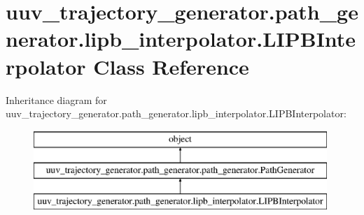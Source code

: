 \hypertarget{classuuv__trajectory__generator_1_1path__generator_1_1lipb__interpolator_1_1LIPBInterpolator}{}\section{uuv\+\_\+trajectory\+\_\+generator.\+path\+\_\+generator.\+lipb\+\_\+interpolator.\+L\+I\+P\+B\+Interpolator Class Reference}
\label{classuuv__trajectory__generator_1_1path__generator_1_1lipb__interpolator_1_1LIPBInterpolator}
Inheritance diagram for uuv\+\_\+trajectory\+\_\+generator.\+path\+\_\+generator.\+lipb\+\_\+interpolator.\+L\+I\+P\+B\+Interpolator\+:\begin{figure}[H]
\begin{center}
\leavevmode
\includegraphics[height=3.000000cm]{classuuv__trajectory__generator_1_1path__generator_1_1lipb__interpolator_1_1LIPBInterpolator}
\end{center}
\end{figure}
